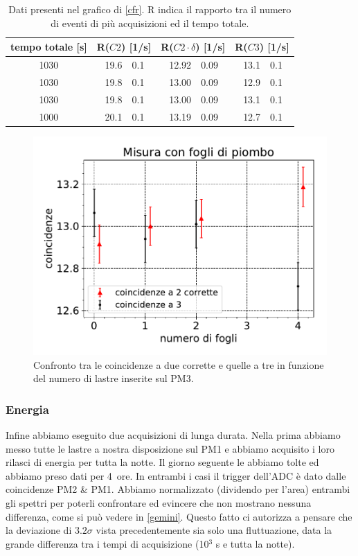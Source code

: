\begin{table}[h]
\centering
\begin{tabular}{| c | r @{$\pm$} l | r @{$\pm$} l | r @{$\pm$} l |}
\hline
tempo totale [\si{s}] & \multicolumn{2}{c|}{R($C2$) [1/\si{s}]} & \multicolumn{2}{c|}{R($C2\cdot \delta$) [1/\si{s}]} & \multicolumn{2}{c|}{R($C3$) [1/\si{s}]} \\
\hline
1030 & 19.6&0.1 & 12.92&0.09 & 13.1&0.1 \\
1030 & 19.8&0.1 & 13.00&0.09 & 12.9&0.1 \\
1030 & 19.8&0.1 & 13.00&0.09 & 13.1&0.1 \\
1000 & 20.1&0.1 & 13.19&0.09 & 12.7&0.1 \\
\hline
\end{tabular}
\caption{Dati presenti nel grafico di \autoref{cfr}. R indica il rapporto tra il numero di eventi di più acquisizioni ed il tempo totale.}
\label{dati cfr}
\end{table}


\begin{figure}[h]
\centering
\includegraphics[width=8 cm]{confronto}
\caption{Confronto tra le coincidenze a due corrette e quelle a tre in funzione del numero di lastre inserite sul PM3.}
\label{cfr}
\end{figure}

\subsubsection{Energia}

\label{sez}
Infine abbiamo eseguito due acquisizioni di lunga durata. Nella prima abbiamo messo tutte le lastre a nostra disposizione sul PM1 e abbiamo acquisito i loro rilasci di energia per tutta la notte. Il giorno seguente le abbiamo tolte ed abbiamo preso dati per \SI{4}{ore}. In entrambi i casi il trigger dell'ADC è dato dalle coincidenze PM2 \& PM1.  Abbiamo normalizzato (dividendo per l'area)
entrambi gli spettri per poterli confrontare ed evincere che non mostrano nessuna differenza, come si può vedere in \autoref{gemini}. Questo fatto ci autorizza a pensare che la deviazione di $3.2\sigma$ vista precedentemente sia solo una fluttuazione, data la grande differenza tra i tempi di acquisizione (10$^3$\! s e tutta la notte). 


